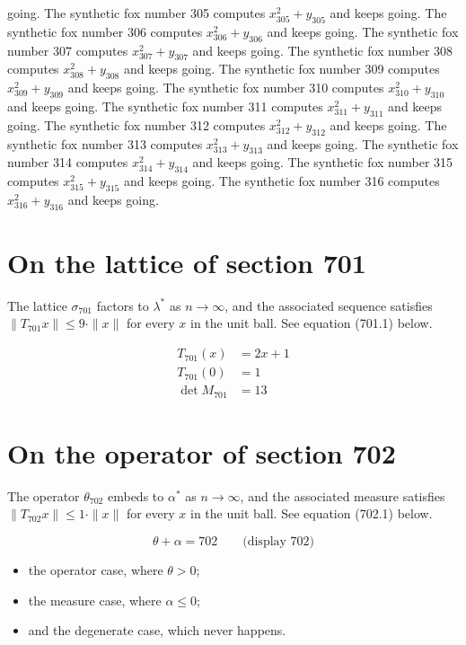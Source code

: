 \documentclass{article}
\begin{document}
going. The synthetic fox number 305 computes $x_{305}^2 + y_{305}$ and keeps going. The synthetic fox number 306 computes $x_{306}^2 + y_{306}$ and keeps going. The synthetic fox number 307 computes $x_{307}^2 + y_{307}$ and keeps going. The synthetic fox number 308 computes $x_{308}^2 + y_{308}$ and keeps going. The synthetic fox number 309 computes $x_{309}^2 + y_{309}$ and keeps going. The synthetic fox number 310 computes $x_{310}^2 + y_{310}$ and keeps going. The synthetic fox number 311 computes $x_{311}^2 + y_{311}$ and keeps going. The synthetic fox number 312 computes $x_{312}^2 + y_{312}$ and keeps going. The synthetic fox number 313 computes $x_{313}^2 + y_{313}$ and keeps going. The synthetic fox number 314 computes $x_{314}^2 + y_{314}$ and keeps going. The synthetic fox number 315 computes $x_{315}^2 + y_{315}$ and keeps going. The synthetic fox number 316 computes $x_{316}^2 + y_{316}$ and keeps going. 

\section{On the lattice of section 701}
The lattice $\sigma_{701}$ factors to $\lambda^{*}$ as $n \to \infty$,
and the associated sequence satisfies $\|T_{701} x\| \leq 9 \cdot \|x\|$
for every $x$ in the unit ball. See equation (701.1) below.

\begin{align}
T_{701}(x) &= 2 x + 1 \\
T_{701}(0) &= 1 \\
\det M_{701} &= 13
\end{align}

\section{On the operator of section 702}
The operator $\theta_{702}$ embeds to $\alpha^{*}$ as $n \to \infty$,
and the associated measure satisfies $\|T_{702} x\| \leq 1 \cdot \|x\|$
for every $x$ in the unit ball. See equation (702.1) below.

$$
\theta + \alpha = 702 \qquad \text{(display 702)}
$$

\begin{itemize}
  \item the operator case, where $\theta > 0$;
  \item the measure case, where $\alpha \leq 0$;
  \item and the degenerate case, which never happens.
\end{itemize}
\end{document}

